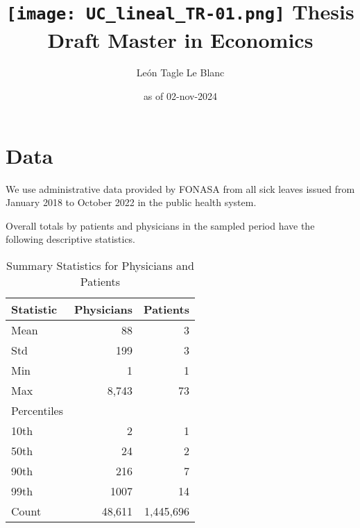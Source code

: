 \documentclass[11pt]{article}
\title{\texttt{[image: UC\_lineal\_TR-01.png]} \linebreak \linebreak 
Thesis Draft \linebreak Master in Economics}
\author{León Tagle Le Blanc}
\date{as of 02-nov-2024}
\begin{document}
\begin{titlepage}
\maketitle
\thispagestyle{empty}

\newpage
\tableofcontents
\setcounter{page}{0}
\thispagestyle{empty}
\end{titlepage}










\section{Data}

We use administrative data provided by FONASA from all sick leaves issued from January 2018 to October 2022 in the public health system.

Overall totals by patients and physicians in the sampled period have the following descriptive statistics.

\begin{table}[h]
    \centering
    \begin{tabular}{lrr}
    \toprule
    Statistic & Physicians & Patients \\
    \midrule
    Mean      & 88     & 3       \\
    Std       & 199     & 3       \\
    Min       & 1      & 1      \\
    Max       & 8,743    & 73     \\
    Percentiles & & \\
    \hspace{1em}10th     & 2       & 1       \\
    \hspace{1em}50th  & 24    & 2       \\
    \hspace{1em}90th    & 216     & 7       \\
    \hspace{1em}99th     & 1007    & 14      \\
    Count     & 48,611   & 1,445,696 \\
    \bottomrule
    \end{tabular}
    \caption{Summary Statistics for Physicians and Patients}
\end{table}
\end{document}
